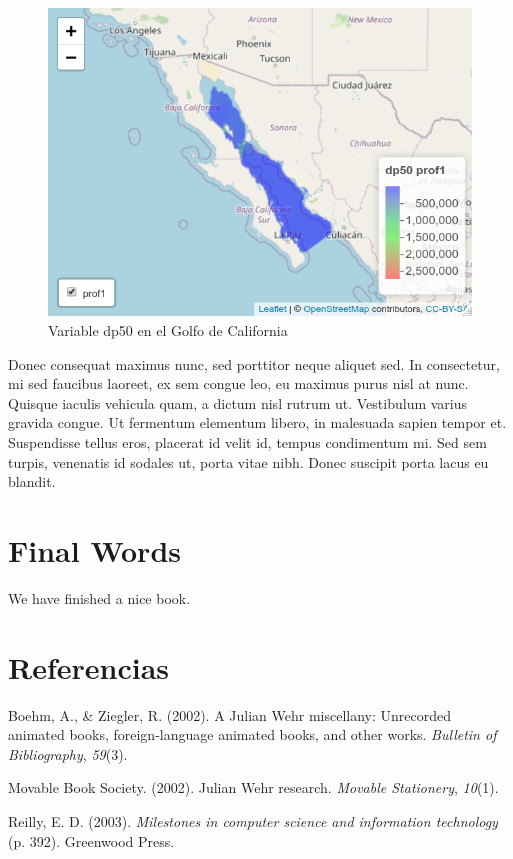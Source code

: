 \documentclass[
]{article}
\newlength{\cslhangindent}
\newenvironment{cslreferences}%
  {\setlength{\parindent}{0pt}%
  \everypar{\setlength{\hangindent}{\cslhangindent}}\ignorespaces}%
  {\par}
\begin{document}
\begin{figure}
\includegraphics[width=0.95\linewidth]{images/golfocalif02} \caption{Variable dp50 en el Golfo de California}\label{fig:Mapa06}
\end{figure}

Donec consequat maximus nunc, sed porttitor neque aliquet sed. In consectetur, mi sed faucibus laoreet, ex sem congue leo, eu maximus purus nisl at nunc. Quisque iaculis vehicula quam, a dictum nisl rutrum ut. Vestibulum varius gravida congue. Ut fermentum elementum libero, in malesuada sapien tempor et. Suspendisse tellus eros, placerat id velit id, tempus condimentum mi. Sed sem turpis, venenatis id sodales ut, porta vitae nibh. Donec suscipit porta lacus eu blandit.

\hypertarget{final-words}{%
\section{Final Words}\label{final-words}}

We have finished a nice book.

\hypertarget{referencias}{%
\section*{Referencias}\label{referencias}}

\hypertarget{refs}{}
\begin{cslreferences}
\leavevmode\hypertarget{ref-Bohem2002}{}%
Boehm, A., \& Ziegler, R. (2002). A Julian Wehr miscellany: Unrecorded animated books, foreign-language animated books, and other works. \emph{Bulletin of Bibliography}, \emph{59}(3).

\leavevmode\hypertarget{ref-MBS2002}{}%
Movable Book Society. (2002). Julian Wehr research. \emph{Movable Stationery}, \emph{10}(1).

\leavevmode\hypertarget{ref-Reilly2003}{}%
Reilly, E. D. (2003). \emph{Milestones in computer science and information technology} (p. 392). Greenwood Press.
\end{cslreferences}
\end{document}
